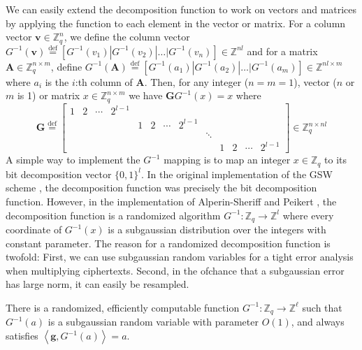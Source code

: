 We can easily extend the decomposition function to work on vectors and matrices by applying the function to each element in the vector or matrix. For a column vector $\mathbf{v} \in \mathbb{Z}_q^n$, we define the column vector $G^{-1}(\mathbf{v}) \stackrel{\mathrm{def}}{=} [G^{-1}(v_1)|G^{-1}(v_2)| \dots |G^{-1}(v_n)] \in \mathbb{Z}^{nl}$ and for a matrix $\mathbf{A} \in \mathbb{Z}_q^{n \times m}$, define $G^{-1}(\mathbf{A}) \stackrel{\mathrm{def}}{=} [G^{-1}(a_1)|G^{-1}(a_2)| \dots |G^{-1}(a_m)] \in \mathbb{Z}^{nl \times m}$ where $a_i$ is the $i$:th column of $\mathbf{A}$. Then, for any integer ($n = m = 1$), vector ($n$ or $m$ is 1) or matrix $x \in \mathbb{Z}_q^{n \times m}$ we have $\mathbf{G}G^{-1}(x) = x$ where 
\begin{equation*}
    \mathbf{G} \stackrel{\mathrm{def}}{=}
    \left[
        \begin{array}{ccccccccccccc}
        1 & 2 & \cdots & 2^{l-1} \\
         & & & & 1 & 2 & \cdots  & 2^{l-1} \\
         & & & & & & & & \ddots \\
         & & & & & & & & & 1 & 2 & \cdots & 2^{l-1}
        \end{array}
    \right] \in \mathbb{Z}_q^{n \times nl}
\end{equation*}
A simple way to implement the $G^{-1}$ mapping is to map an integer $x \in \mathbb{Z}_q$ to its bit decomposition vector $\{0,1\}^{l}$. In the original implementation of the GSW scheme \cite{GSW13}, the decomposition function was precisely the bit decomposition function. However, in the implementation of Alperin-Sheriff and Peikert \cite{A-S-P-boot}, the decomposition function is a randomized algorithm $G^{-1} \colon \mathbb{Z}_q \to \mathbb{Z}^{l}$ where every coordinate of $G^{-1}(x)$ is a subgaussian distribution over the integers with constant parameter. The reason for a randomized decomposition function is twofold: First, we can use subgaussian random variables for a tight error analysis when multiplying ciphertexts. Second, in the ofchance that a subgaussian error has large norm, it can easily be resampled.

\begin{theorem}\label{thm:decomposition}
    There is a randomized, efficiently computable function $G^{-1}: \mathbb{Z}_q \rightarrow \mathbb{Z}^{\ell}$ such that $G^{-1}(a)$ is a subgaussian random variable with parameter $O(1)$, and always satisfies $\left \langle \mathbf{g}, G^{-1}(a) \right \rangle=a$. 
\end{theorem}

